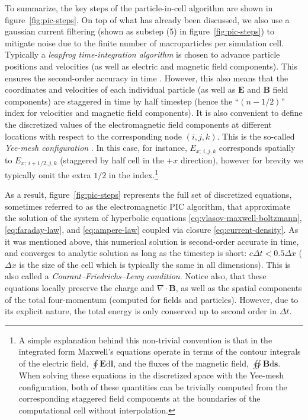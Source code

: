 To summarize, the key steps of the particle-in-cell algorithm are shown in figure~\ref{fig:pic-steps}. On top of what has already been discussed, we also use a gaussian current filtering (shown as substep (5) in figure~\ref{fig:pic-steps}) to mitigate noise due to the finite number of macroparticles per simulation cell. Typically a \emph{leapfrog time-integration algorithm} is chosen to advance particle positions and velocities (as well as electric and magnetic field components). This ensures the second-order accuracy in time \citep{1991ppcs.book.....B}. However, this also means that the coordinates and velocities of each individual particle (as well as $\bm{E}$ and $\bm{B}$ field components) are staggered in time by half timestep (hence the ``${(n-1/2)}$'' index for velocities and magnetic field components). It is also convenient to define the discretized values of the electromagnetic field components at different locations with respect to the corresponding node $(i,j,k)$. This is the so-called \emph{Yee-mesh configuration} \citep{1966ITAP...14..302Y}. In this case, for instance, $E_{x;~i,j,k}$ corresponds spatially to $E_{x;~i+1/2,j,k}$ (staggered by half cell in the $+x$ direction), however for brevity we typically omit the extra $1/2$ in the index.\footnote{A simple explanation behind this non-trivial convention is that in the integrated form Maxwell's equations operate in terms of the contour integrals of the electric field, $\oint\bm{E}\mathrm{d}\bm{l}$, and the fluxes of the magnetic field, $\oiint \bm{B}\mathrm{d}\bm{s}$. When solving these equations in the discretized space with the Yee-mesh configuration, both of these quantities can be trivially computed from the corresponding staggered field components at the boundaries of the computational cell without interpolation.}

As a result, figure~\ref{fig:pic-steps} represents the full set of discretized equations, sometimes referred to as the electromagnetic PIC algorithm, that approximate the solution of the system of hyperbolic equations \eqref{eq:vlasov-maxwell-boltzmann}, \eqref{eq:faraday-law}, and \eqref{eq:ampere-law} coupled via closure \eqref{eq:current-density}. As it was mentioned above, this numerical solution is second-order accurate in time, and converges to analytic solution as long as the timestep is short: $c\Delta t<0.5\Delta x$ ($\Delta x$ is the size of the cell which is typically the same in all dimensions). This is also called a \emph{Courant–Friedrichs–Lewy condition}. Notice also, that these equations locally preserve the charge and $\nabla\cdot\bm{B}$, as well as the spatial components of the total four-momentum (computed for fields and particles). However, due to its explicit nature, the total energy is only conserved up to second order in $\Delta t$.

